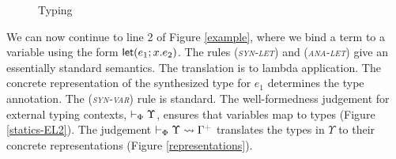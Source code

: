 \documentclass[9pt,preprint]{sigplanconf}
\newcommand{\rulename}[1]{({\textsc{\textsl{#1}}})}
\newcommand{\moutput}{^{\color{gray}{+}}}
\begin{document}
\begin{figure*}[t]
\begin{mathpar}

\end{mathpar}
\caption{Typing}
\label{statics-EL}
\end{figure*}

We can now continue to line 2 of Figure \ref{example}, where we bind a term to a variable using the form $\elet{e_1}{x}{e_2}$. The rules \rulename{syn-let} and \rulename{ana-let} give an essentially standard semantics. The translation is to lambda application. The concrete representation of the synthesized type for $e_1$ determines the type annotation. The \rulename{syn-var} rule is standard. The well-formedness judgement for external typing contexts, $\ctxok{\Phi}{\Upsilon}$, ensures that variables map to types (Figure \ref{statics-EL2}). The judgement $\vdash_\Phi \Upsilon \leadsto \Gamma\moutput$ translates the types in $\Upsilon$ to their concrete representations (Figure \ref{representations}).
\end{document}
